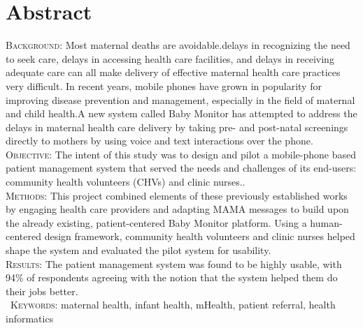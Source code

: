 \section{Abstract}
\textsc{Background:} Most maternal deaths are avoidable.delays in recognizing the need to seek care, delays in accessing  health care facilities, and delays in receiving adequate care can all make delivery of effective maternal health care practices very difficult. In recent years, mobile phones have grown in popularity for improving disease prevention and management, especially in the field of maternal and child health.A new system called Baby Monitor has attempted to address the delays in maternal health care delivery by taking pre- and post-natal screenings directly to mothers by using voice and text interactions over the phone. \\
\textsc{Objective:} The intent of this study was to design and pilot a mobile-phone based patient management system that served the needs and challenges of its end-users: community health volunteers (CHVs) and clinic nurses.. \\
\textsc{Methods:} This project combined elements of these previously established works by engaging health care providers and adapting MAMA messages to build upon the already existing, patient-centered Baby Monitor platform. Using a human-centered design framework, community health volunteers and clinic nurses helped shape the system and evaluated the pilot system for usability.\\
\textsc{Results:} The patient management system was found to be highly usable, with 94\% of respondents agreeing with the notion that the system helped them do their jobs better. \\\
\textsc{Keywords:} maternal health, infant health, mHealth, patient referral, health informatics